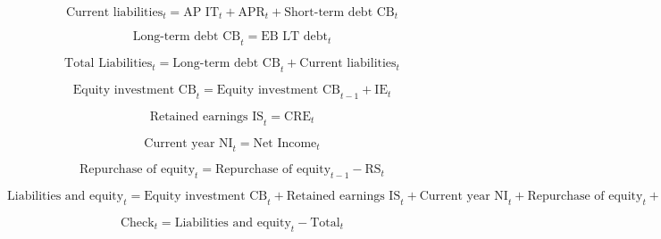 \documentclass[12pt]{article}
\numberwithin{equation}{section}
\begin{document}
\begin{equation}
	\text{Current liabilities}_{t} = \text{AP IT}_{t} + \text{APR}_{t} + \text{Short-term debt CB}_{t}
\end{equation}

\begin{equation}
	\text{Long-term debt CB}_{t} = \text{EB LT debt}_{t}
\end{equation}

\begin{equation}
	\text{Total Liabilities}_{t} =  \text{Long-term debt CB}_{t} + \text{Current liabilities}_{t}
\end{equation}

\begin{equation}
	\text{Equity investment CB}_{t} = \text{Equity investment CB}_{t-1} + \text{IE}_{t}
\end{equation}

\begin{equation}
	\text{Retained earnings IS}_{t} = \text{CRE}_{t}
\end{equation}

\begin{equation}
	\text{Current year NI}_{t} = \text{Net Income}_{t}
\end{equation}

\begin{equation}
	\text{Repurchase of equity}_{t} = \text{Repurchase of equity}_{t-1} - \text{RS}_{t}
\end{equation}

\begin{equation}
	\text{Liabilities and equity}_{t} = \text{Equity investment CB}_{t} + \text{Retained earnings IS}_{t} + \text{Current year NI}_{t} + \text{Repurchase of equity}_{t} + \text{Total Liabilities}_{t}
\end{equation}

\begin{equation}
	\text{Check}_{t} = \text{Liabilities and equity}_{t} - \text{Total}_{t}
\end{equation}
\end{document}
